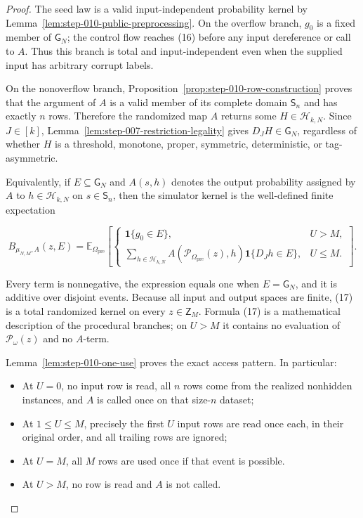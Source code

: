 \begin{proof}
The seed law is a valid input-independent probability kernel by
Lemma~\ref{lem:step-010-public-preprocessing}. On the overflow branch,
\(g_0\) is a fixed member of \(\mathsf G_N\); the control flow reaches (16)
before any input dereference or call to \(A\). Thus this branch is total and
input-independent even when the supplied input has arbitrary corrupt
labels.

On the nonoverflow branch,
Proposition~\ref{prop:step-010-row-construction} proves that the argument of
\(A\) is a valid member of its complete domain \(\mathsf S_n\) and has
exactly \(n\) rows. Therefore the randomized map \(A\) returns some
\(H\in\mathcal H_{k,N}\). Since \(J\in[k]\), Lemma~\ref{lem:step-007-restriction-legality} gives
\(D_JH\in\mathsf G_N\), regardless of whether \(H\) is a threshold,
monotone, proper, symmetric, deterministic, or tag-asymmetric.

Equivalently, if \(E\subseteq\mathsf G_N\) and
\(A(s,h)\) denotes the output probability assigned by \(A\) to
\(h\in\mathcal H_{k,N}\) on \(s\in\mathsf S_n\), then the simulator kernel
is the well-defined finite expectation

\[
B_{\mu_{N,M},A}(z,E)
=
\mathbb E_{\Omega_{\mathrm{pre}}}
\left[
\begin{cases}
  \mathbf1\{g_0\in E\}, & U>M,\\[1mm]
  \displaystyle
  \sum_{h\in\mathcal H_{k,N}}
    A(\mathcal P_{\Omega_{\mathrm{pre}}}(z),h)
    \mathbf1\{D_Jh\in E\}, & U\le M.
\end{cases}
\right].
\tag{17}
\]

Every term is nonnegative, the expression equals one when
\(E=\mathsf G_N\), and it is additive over disjoint events. Because all
input and output spaces are finite, (17) is a total randomized kernel on
every \(z\in\mathsf Z_M\). Formula (17) is a mathematical description of
the procedural branches; on \(U>M\) it contains no evaluation of
\(\mathcal P_\omega(z)\) and no \(A\)-term.

Lemma~\ref{lem:step-010-one-use} proves the exact access pattern. In
particular:

\begin{itemize}
\item At \(U=0\), no input row is read, all \(n\) rows come from the realized
  nonhidden instances, and \(A\) is called once on that size-\(n\) dataset;
\item At \(1\le U\le M\), precisely the first \(U\) input rows are read once
  each, in their original order, and all trailing rows are ignored;
\item At \(U=M\), all \(M\) rows are used once if that event is possible.
\item At \(U>M\), no row is read and \(A\) is not called.
\end{itemize}


\end{proof}
